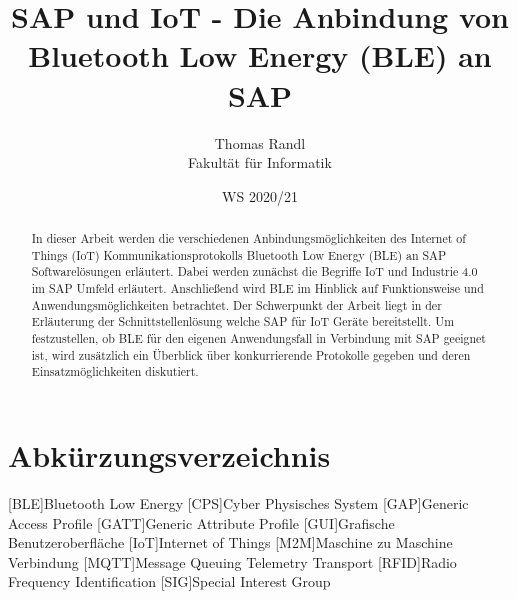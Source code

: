 \documentclass[twoside=false, %
    DIV=15
    ,%
    BCOR=15mm, %
    headinclude=true,
    footinclude=false,
    pagesize,%
    fontsize=12pt,%
    paper=a4,%
    numbers=noenddot
  ]{scrartcl}
\begin{document}
\def\figdir{figures}
\def\tabledir{tables}

\titlehead{
\raggedleft
\texttt{[image: \\figdir/logo-th-rosenheim-2019\_master\_quer\_2c.eps]}
}

\title{
\vspace*{0cm}
SAP und IoT - Die Anbindung von Bluetooth Low Energy (BLE) an SAP
}

\author{
Thomas Randl\\
Fakultät für Informatik}

\date{WS 2020/21}

\maketitle
\thispagestyle{empty}

\begin{abstract}
In dieser Arbeit werden die verschiedenen Anbindungsmöglichkeiten des Internet of Things (IoT) Kommunikationsprotokolls Bluetooth Low Energy (BLE) an SAP Softwarelösungen erläutert. Dabei werden zunächst die Begriffe IoT und Industrie 4.0 im SAP Umfeld erläutert. Anschließend wird BLE im Hinblick auf Funktionsweise und Anwendungsmöglichkeiten betrachtet.
Der Schwerpunkt der Arbeit liegt in der Erläuterung der Schnittstellenlösung welche SAP für IoT Geräte bereitstellt. Um festzustellen, ob BLE für den eigenen Anwendungsfall in Verbindung mit SAP geeignet ist, wird zusätzlich ein Überblick über konkurrierende Protokolle gegeben und deren Einsatzmöglichkeiten diskutiert.
\end{abstract}

\newpage

\tableofcontents
{}

\newpage

\listoffigures

\newpage

\section*{Abkürzungsverzeichnis} %
\begin{acronym}[ECUAFFF]
	[BLE]{Bluetooth Low Energy}
	[CPS]{Cyber Physisches System}
	[GAP]{Generic Access Profile}
	[GATT]{Generic Attribute Profile}
	[GUI]{Grafische Benutzeroberfläche}
	[IoT]{Internet of Things}
	[M2M]{Maschine zu Maschine Verbindung}
	[MQTT]{Message Queuing Telemetry Transport}
	[RFID]{Radio Frequency Identification}
	[SIG]{Special Interest Group}
\end{acronym}


\newpage


\pagestyle{headings}



%




\end{document}
